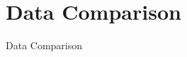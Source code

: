 \documentclass[10pt]{beamer}
\begin{document}
\section{Data Comparison}
\begin{frame}{Data Comparison} 


\end{frame}





{\1 
\begin{frame}
\end{frame} 
}
\end{document}
